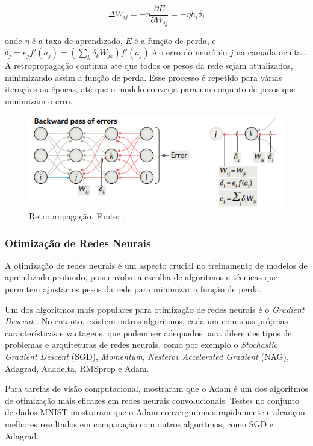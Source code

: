 \begin{equation}
    \Delta W_{ij} = -\eta \frac{\partial E}{\partial W_{ij}} = -\eta h_i \delta_j
\end{equation}

onde $\eta$ é a taxa de aprendizado, $E$ é a função de perda, e $\delta_j = e_j f'(a_j) = (\sum_k \delta_k W_{jk}) f'(a_j)$ é o erro do neurônio $j$ na camada oculta \citep{Lillicrap2020}. A retropropagação continua até que todos os pesos da rede sejam atualizados, minimizando assim a função de perda. Esse processo é repetido para várias iterações ou épocas, até que o modelo converja para um conjunto de pesos que minimizam o erro.

\begin{figure}[h]
    \centering
    \includegraphics[width=\linewidth]{figs/backward-pass.png}
    \caption{Retropropagação. Fonte: \cite{Lillicrap2020}.}
    \label{backward-pass}
\end{figure}

\subsubsection{Otimização de Redes Neurais}

A otimização de redes neurais é um aspecto crucial no treinamento de modelos de aprendizado profundo, pois envolve a escolha de algoritmos e técnicas que permitem ajustar os pesos da rede para minimizar a função de perda.

Um dos algoritmos mais populares para otimização de redes neurais é o \textit{Gradient Descent} \citep{Ruder2017}. No entanto, existem outros algoritmos, cada um com suas próprias características e vantagens, que podem ser adequados para diferentes tipos de problemas e arquiteturas de redes neurais, como por exemplo o \textit{Stochastic Gradient Descent} (SGD), \textit{Momentum}, \textit{Nesterov Accelerated Gradient} (NAG), Adagrad, Adadelta, RMSprop e Adam.

Para tarefas de visão computacional, \cite{Kingma2015} mostraram que o Adam é um dos algoritmos de otimização mais eficazes em redes neurais convolucionais. Testes no conjunto de dados MNIST mostraram que o Adam convergiu mais rapidamente e alcançou melhores resultados em comparação com outros algoritmos, como SGD e Adagrad.

